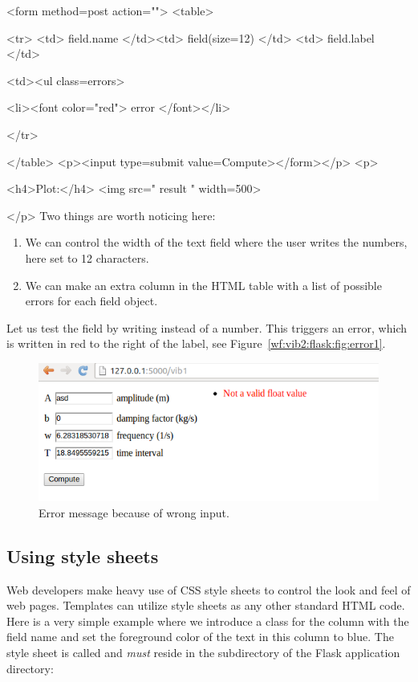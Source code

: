 \documentclass[%
oneside,                 %
final,                   %
10pt]{article}
\begin{document}
{{{{{{{{{{{\bhtmlpro
<form method=post action="">
<table>
  {%
    <tr>
    <td>{{ field.name }}</td><td>{{ field(size=12) }}</td>
    <td>{{ field.label }}</td>
    {%
      <td><ul class=errors>
      {%
        <li><font color="red">{{ error }}</font></li>
      {%
    {%
    </tr>
  {%
</table>
<p><input type=submit value=Compute></form></p>
<p>
{%
<h4>Plot:</h4>
<img src="{{ result }}" width=500>
{%
</p>
\ehtmlpro
Two things are worth noticing here:

\begin{enumerate}
\item We can control the width of the text field where the
   user writes the numbers, here set to 12 characters.

\item We can make an extra column in the HTML table with a list
   of possible errors for each field object.
\end{enumerate}

\noindent
Let us test the  field by writing  instead of a number. This
triggers an error, which is written in red to the right of the label,
see Figure~\ref{wf:vib2:flask:fig:error1}.


\begin{figure}[ht]
  \centerline{\includegraphics[width=0.9\linewidth]{fig-web4sa/vib1_flask_error1.png}}
  \caption{
  Error message because of wrong input. \label{wf:vib1:flask:fig:error1}
  }
\end{figure}


\subsection{Using style sheets}


Web developers make heavy use of CSS style sheets to control the look
and feel of web pages. Templates can utilize style sheets as any other
standard HTML code. Here is a very simple example where we introduce
a class  for the column with the field name and set the
foreground color of the text in this column to blue.
The style sheet is called  and \emph{must} reside in the
 subdirectory of the Flask application directory:

}}}}}}}}}}}}}}}}}}}
\end{document}
